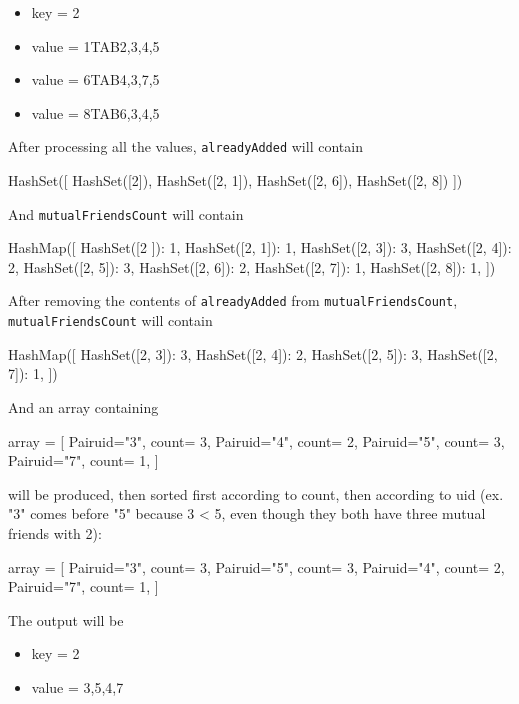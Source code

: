 \documentclass[11pt]{article}
\begin{document}
\begin{justifying}
\begin{itemize}
    \item key \space \space \space = 2
    \item value = 1TAB2,3,4,5
    \item value = 6TAB4,3,7,5
    \item value = 8TAB6,3,4,5
\end{itemize}
After processing all the values, \verb|alreadyAdded| will contain
\begin{python}
HashSet([
    HashSet([2]),
    HashSet([2, 1]),
    HashSet([2, 6]),
    HashSet([2, 8])
])
\end{python}
And \verb|mutualFriendsCount| will contain
\begin{python}
HashMap([
    HashSet([2   ]): 1,
    HashSet([2, 1]): 1,
    HashSet([2, 3]): 3,
    HashSet([2, 4]): 2,
    HashSet([2, 5]): 3,
    HashSet([2, 6]): 2,
    HashSet([2, 7]): 1,
    HashSet([2, 8]): 1,
])
\end{python}
After removing the contents of \verb|alreadyAdded| from \verb|mutualFriendsCount|, \verb|mutualFriendsCount| will contain
\begin{python}
HashMap([
    HashSet([2, 3]): 3,
    HashSet([2, 4]): 2,
    HashSet([2, 5]): 3,
    HashSet([2, 7]): 1,
])
\end{python}
And an array containing
\begin{python}
array = [
    Pair{uid="3", count= 3},
    Pair{uid="4", count= 2},
    Pair{uid="5", count= 3},
    Pair{uid="7", count= 1},
]
\end{python}
will be produced, then sorted first according to count, then according to uid (ex. "3" comes before "5" because 3 < 5, even though they both have three mutual friends with 2):
\begin{python}
array = [
    Pair{uid="3", count= 3},
    Pair{uid="5", count= 3},
    Pair{uid="4", count= 2},
    Pair{uid="7", count= 1},
]
\end{python}
The output will be
\begin{itemize}
    \item key = 2
    \item value = 3,5,4,7
\end{itemize}
\end{justifying}
\end{document}

